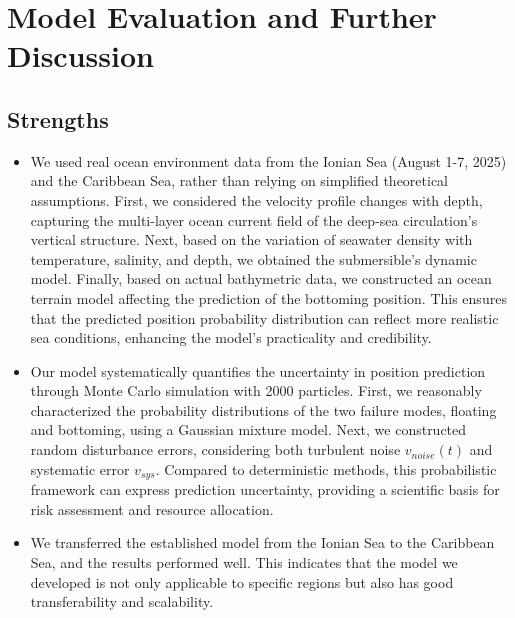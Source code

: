 \documentclass{mcmthesis}
\begin{document}
\section{Model Evaluation and Further Discussion}
\subsection{Strengths}
\begin{itemize}
  \item We used real ocean environment data from the Ionian Sea (August 1-7, 2025) and the Caribbean Sea,
rather than relying on simplified theoretical assumptions.
First, we considered the velocity profile changes with depth, capturing the multi-layer ocean current field of the deep-sea circulation's vertical structure.
Next, based on the variation of seawater density with temperature, salinity, and depth, we obtained the submersible's dynamic model.
Finally, based on actual bathymetric data, we constructed an ocean terrain model affecting the prediction of the bottoming position.
This ensures that the predicted position probability distribution can reflect more realistic sea conditions, enhancing the model's practicality and credibility.
  \item Our model systematically quantifies the uncertainty in position prediction through Monte Carlo simulation with 2000 particles.
First, we reasonably characterized the probability distributions of the two failure modes, floating and bottoming, using a Gaussian mixture model.
Next, we constructed random disturbance errors, considering both turbulent noise $v_{noise}(t)$ and systematic error $v_{sys}$.
Compared to deterministic methods, this probabilistic framework can express prediction uncertainty,
providing a scientific basis for risk assessment and resource allocation.
  \item We transferred the established model from the Ionian Sea to the Caribbean Sea, and the results performed well.
This indicates that the model we developed is not only applicable to specific regions but also has good transferability and scalability.
\end{itemize}
\end{document}
